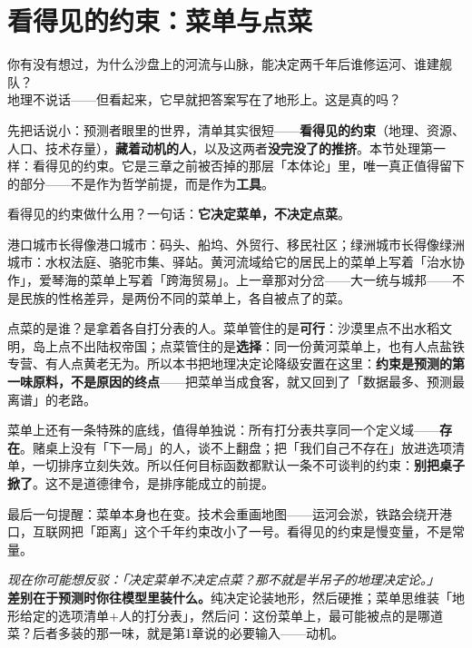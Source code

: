\documentclass[../../main2.tex]{subfiles}
\begin{document}
	\section{看得见的约束：菜单与点菜}
	\label{sec:goal-constraints}

	\begin{readingnote}
		你有没有想过，为什么沙盘上的河流与山脉，能决定两千年后谁修运河、谁建舰队？\\
		地理不说话——但看起来，它早就把答案写在了地形上。这是真的吗？
	\end{readingnote}

	先把话说小：预测者眼里的世界，清单其实很短——\textbf{看得见的约束}（地理、资源、人口、技术存量），\textbf{藏着动机的人}，以及这两者\textbf{没完没了的推挤}。本节处理第一样：看得见的约束。它是三章之前被否掉的那层「本体论」里，唯一真正值得留下的部分——不是作为哲学前提，而是作为\textbf{工具}。

	看得见的约束做什么用？一句话：\textbf{它决定菜单，不决定点菜}。

	港口城市长得像港口城市：码头、船坞、外贸行、移民社区；绿洲城市长得像绿洲城市：水权法庭、骆驼市集、驿站。黄河流域给它的居民上的菜单上写着「治水协作」，爱琴海的菜单上写着「跨海贸易」。上一章那对分岔——大一统与城邦——不是民族的性格差异，是两份不同的菜单上，各自被点了的菜。

	点菜的是谁？是拿着各自打分表的人。菜单管住的是\textbf{可行}：沙漠里点不出水稻文明，岛上点不出陆权帝国；点菜管住的是\textbf{选择}：同一份黄河菜单上，也有人点盐铁专营、有人点黄老无为。所以本书把地理决定论降级安置在这里：\textbf{约束是预测的第一味原料，不是原因的终点}——把菜单当成食客，就又回到了「数据最多、预测最离谱」的老路。

	菜单上还有一条特殊的底线，值得单独说：所有打分表共享同一个定义域——\textbf{存在}。赌桌上没有「下一局」的人，谈不上翻盘；把「我们自己不存在」放进选项清单，一切排序立刻失效。所以任何目标函数都默认一条不可谈判的约束：\textbf{别把桌子掀了}。这不是道德律令，是排序能成立的前提。

	最后一句提醒：菜单本身也在变。技术会重画地图——运河会淤，铁路会绕开港口，互联网把「距离」这个千年约束改小了一号。看得见的约束是慢变量，不是常量。

	\begin{questionbox}
		\textit{现在你可能想反驳：「决定菜单不决定点菜？那不就是半吊子的地理决定论。」}\\
		\textbf{差别在于预测时你往模型里装什么。}纯决定论装地形，然后硬推；菜单思维装「地形给定的选项清单+人的打分表」，然后问：这份菜单上，最可能被点的是哪道菜？后者多装的那一味，就是第1章说的必要输入——动机。
	\end{questionbox}
\end{document}
